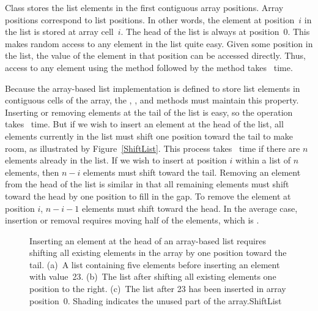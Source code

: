 Class  stores the list elements in the first
 contiguous array positions.
Array positions correspond to list positions.
In other words, the element at position~\(i\) in the list is stored
at array cell~\(i\).
The head of the list is always at position~0.
This makes random access to any element in the list quite easy.
Given some position in the list, the value of the element
in that position can be accessed directly.
Thus, access to any element using the
 method followed by the  method takes
\Thetaone\ time.

Because the array-based list implementation is defined to store list
elements in contiguous cells of the array, the
,
, and 
methods must maintain this property.
Inserting or removing elements at the tail of the list
is easy, so the  operation takes \Thetaone\ time.
But if we wish to insert an element at the head of the list,
all elements currently in the list must shift one position toward the
tail to make room, as illustrated by Figure~\ref{ShiftList}.
This process takes \Thetan\ time if there are \(n\) elements already in
the list.
If we wish to insert at position \(i\) within a list of \(n\)
elements, then \(n - i\) elements must shift toward the tail.
Removing an element from the head of the list is
similar in that all remaining elements  must shift toward
the head by one position to fill in the gap.
To remove the element at position \(i\), \(n - i - 1\) elements must
shift toward the head.
In the average case, insertion or removal requires moving half
of the elements, which is \Thetan.

\begin{figure}
\smallskip

{Inserting an element at the head of an array-based list requires
shifting all existing elements in the array by one position
toward the tail.
(a)~A list containing five elements before inserting an element with
value~23.
(b)~The list after shifting all existing elements one position to the
right.
(c)~The list after 23 has been inserted in array position~0.
Shading indicates the unused part of the array.}{ShiftList}
\bigskip
\end{figure}

